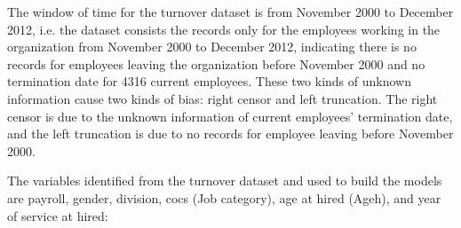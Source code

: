 \documentclass[12pt,letterpaper]{article}
\begin{document}
The window of time for the turnover dataset is from November 2000 to December 2012, i.e. the dataset consists the records only for the employees working in the organization from November 2000 to December 2012, indicating there is no records for employees leaving the organization before November 2000 and no termination date for 4316 current employees. These two kinds of unknown information cause two kinds of bias: right censor and left truncation. The right censor is due to the unknown information of current employees' termination date, and the left truncation is due to no records for employee leaving before November 2000.



The variables identified from the turnover dataset and used to build the models are payroll, gender, division, cocs (Job category), age at hired (Ageh),  and year of service at hired:
\end{document}
